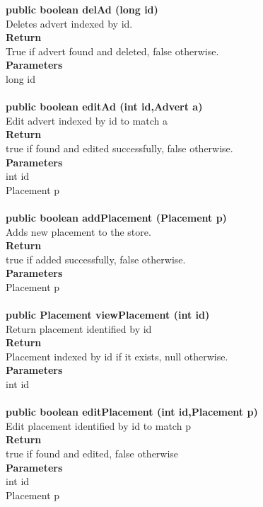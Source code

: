 \documentclass{l3deliverable}
\begin{document}
\textbf{public boolean delAd (long id)}\\
Deletes advert indexed by id.\\
\textbf{Return}\\
True if advert found and deleted, false otherwise.\\
\textbf{Parameters}\\
long id\\
\\

\textbf{public boolean editAd (int id,Advert a)}\\
Edit advert indexed by id to match a \\
\textbf{Return}\\
true if found and edited successfully, false otherwise.\\
\textbf{Parameters}\\
int id\\
Placement p\\
\\


\textbf{public boolean addPlacement (Placement p)}\\
Adds new placement to the store.\\
\textbf{Return}\\
true if added successfully, false otherwise.\\
\textbf{Parameters}\\
Placement p\\
\\

\textbf{public Placement viewPlacement (int id)}\\
Return placement identified by id\\
\textbf{Return}\\
Placement indexed by id if it exists, null otherwise.\\
\textbf{Parameters}\\
int id\\
\\

\textbf{public boolean editPlacement (int id,Placement p)}\\
Edit placement identified by id to match p\\
\textbf{Return}\\
true if found and edited, false otherwise\\
\textbf{Parameters}\\
int id\\
Placement p\\
\\
\end{document}

